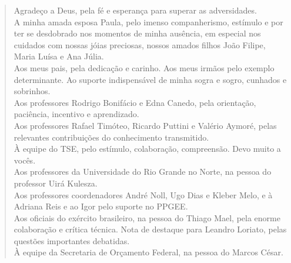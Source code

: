 


\begin{quote}

Agradeço a Deus, pela fé e esperança para superar as adversidades.\\
A minha amada esposa Paula, pelo imenso companherismo, estímulo e por ter se
desdobrado nos momentos de minha ausência, em especial nos cuidados com nossas jóias
preciosas, nossos amados filhos João Filipe, Maria Luísa e Ana Júlia.\\
Aos meus pais, pela dedicação e carinho. Aos meus irmãos pelo exemplo
determinante. Ao suporte indispensável de minha sogra e sogro, cunhados e
sobrinhos.\\
Aos professores Rodrigo Bonifácio e Edna Canedo, pela orientação,
paciência, incentivo e aprendizado.\\
Aos professores Rafael Timóteo, Ricardo Puttini e Valério Aymoré, pelas
relevantes contribuições do conhecimento transmitido.\\
À equipe do TSE, pelo estímulo, colaboração, compreensão. Devo muito a vocês.\\
Aos professores da Universidade do Rio Grande no Norte, na pessoa do professor
Uirá Kulesza.\\
Aos professores coordenadores André Noll, Ugo Dias e Kleber Melo, e à
Adriana Reis e ao Igor pelo suporte no PPGEE.\\
Aos oficiais do exército brasileiro, na pessoa do Thiago Mael, pela enorme
colaboração e crítica técnica. Nota de destaque para Leandro Loriato, pelas
questões importantes debatidas.\\
À equipe da Secretaria de Orçamento Federal, na pessoa do Marcos
César.\\



 
\end{quote}

\clearpage

\pagebreak


